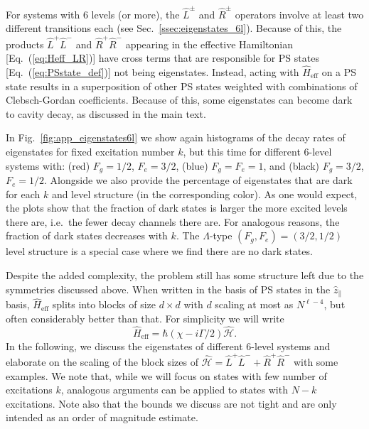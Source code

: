 \documentclass[aps,prx,superscriptaddress,twocolumn,notitlepage,nofootinbib,longbibliography]{revtex4-2}
\newcommand{\quv}{\hat{z}}
\begin{document}
For systems with 6 levels (or more), the $\hat{L}^\pm$ and $\hat{R}^\pm$ operators involve at least two different transitions each (see Sec.~\ref{ssec:eigenstates_6l}). Because of this, the products $\hat{L}^+\hat{L}^-$ and $\hat{R}^+\hat{R}^-$ appearing in the effective Hamiltonian [Eq.~(\ref{eq:Heff_LR})] have cross terms that are responsible for PS states [Eq.~(\ref{eq:PSstate_def})] not being eigenstates. Instead, acting with $\hat{H}_\text{eff}$ on a PS state results in a superposition of other PS states weighted with combinations of Clebsch-Gordan coefficients. Because of this, some eigenstates can become dark to cavity decay, as discussed in the main text.

In Fig.~\ref{fig:app_eigenstates6l} we show again histograms of the decay rates of eigenstates for fixed excitation number $k$, but this time for different 6-level systems with: (red) $F_g=1/2$, $F_e=3/2$, (blue) $F_g=F_e=1$, and (black) $F_g=3/2$, $F_e=1/2$. Alongside we also provide the percentage of eigenstates that are dark for each $k$ and level structure (in the corresponding color). As one would expect, the plots show that the fraction of dark states is larger the more excited levels there are, i.e.~the fewer decay channels there are. For analogous reasons, the fraction of dark states decreases with $k$. The $\Lambda$-type $(F_g,F_e)=(3/2,1/2)$ level structure is a special case where we find there are no dark states.

Despite the added complexity, the problem still has some structure left due to the symmetries discussed above. When written in the basis of PS states in the $\quv_\parallel$ basis, $\hat{H}_\text{eff}$ splits into blocks of size $d\times d$ with $d$ scaling at most as $N^{\ell-4}$, but often considerably better than that. For simplicity we will write
\begin{equation}
    \hat{H}_\text{eff} = \hbar(\chi-i\Gamma/2) \hat{\mathcal{H}}.
\label{eq:H_norm}
\end{equation}
In the following, we discuss the eigenstates of different 6-level systems and elaborate on the scaling of the block sizes of $\hat{\mathcal{H}}=\hat{L}^+\hat{L}^- + \hat{R}^+\hat{R}^-$ with some examples. We note that, while we will focus on states with few number of excitations $k$, analogous arguments can be applied to states with $N-k$ excitations.
Note also that the bounds we discuss are not tight and are only intended as an order of magnitude estimate.
\end{document}
